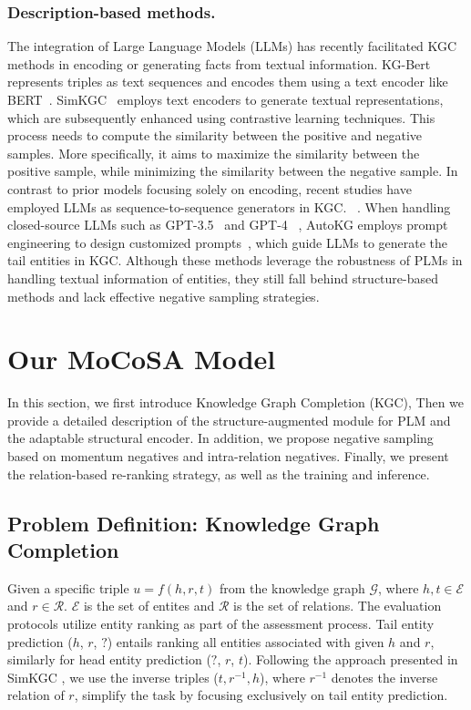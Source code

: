 \documentclass[11pt]{article}
\begin{document}
\subsubsection{Description-based methods.}

The integration of Large Language Models (LLMs) has recently facilitated KGC methods in encoding or generating facts from textual information. KG-Bert~\cite{yao2019kg} represents triples as text sequences and encodes them using a text encoder like BERT~\cite{devlin-etal-2019-bert}. SimKGC~\cite{Wang2022SimKGCSC} employs text encoders to generate textual representations, which are subsequently enhanced using contrastive learning techniques. This process needs to compute the similarity between the positive and negative samples. More specifically, it aims to maximize the similarity between the positive sample, while minimizing the similarity between the negative sample. In contrast to prior models focusing solely on encoding, recent studies have employed LLMs as sequence-to-sequence generators in KGC. ~\cite{Xie2022FromDT, Saxena2022SequencetoSequenceKG, Xie2022FromDT}. When handling closed-source LLMs such as GPT-3.5~\cite{Chen2020BigSM} and GPT-4 ~\cite{OpenAI2023GPT4TR}, AutoKG employs prompt engineering to design customized prompts~\cite{Zhu2023LLMsFK}, which guide LLMs to generate the tail entities in KGC. Although these methods leverage the robustness of PLMs in handling textual information of entities, they still fall behind structure-based methods and lack effective negative sampling strategies.


\section{Our MoCoSA Model}

In this section, we first introduce Knowledge Graph Completion (KGC), Then we provide a detailed description of the structure-augmented module for PLM and the adaptable structural encoder. In addition, we propose negative sampling based on momentum negatives and intra-relation negatives. Finally, we present the relation-based re-ranking strategy, as well as the training and inference.

\subsection{Problem Definition: Knowledge Graph Completion}

Given a specific triple $u=f(h,r,t)$ from the knowledge graph $\mathcal{G}$, where $h, t\in \mathcal{E}$ and $r\in \mathcal{R}$. $\mathcal{E}$ is the set of entites and $\mathcal{R}$ is the set of relations. The evaluation protocols utilize entity ranking as part of the assessment process. Tail entity prediction ($h$, $r$, $?$) entails ranking all entities associated with given $h$ and $r$, similarly for head entity prediction ($?$, $r$, $t$). Following the approach presented in SimKGC \cite{Wang2022SimKGCSC}, we use the inverse triples ($t, r^{-1}, h$), where $r^{-1}$ denotes the inverse relation of $r$, simplify the task by focusing exclusively on tail entity prediction.
\end{document}
